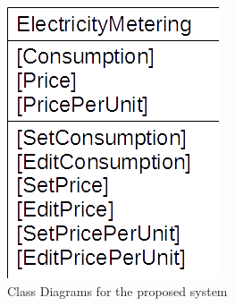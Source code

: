\begin{figure}[H]
    \includegraphics[width=\textwidth]{./ElectricityMetering.png}
    \caption{Class Diagrams for the proposed system} \label{fig:ElectricityMetering Class Diagram}
\end{figure}
